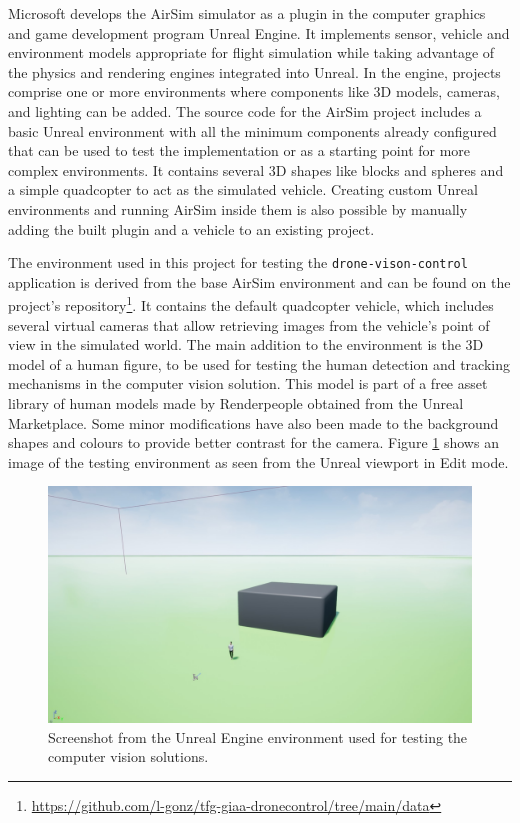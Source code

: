 Microsoft develops the AirSim simulator as a plugin in the computer graphics and game development program Unreal Engine.
It implements sensor, vehicle and environment models appropriate for flight simulation while taking advantage of the physics and rendering engines integrated into Unreal.
In the engine, projects comprise one or more environments where components like 3D models, cameras, and lighting can be added. 
The source code for the AirSim project includes a basic Unreal environment with all the minimum components already configured that can be used to test the implementation or as a starting point for more complex environments. It contains several 3D shapes like blocks and spheres and a simple quadcopter to act as the simulated vehicle.
Creating custom Unreal environments and running AirSim inside them is also possible by manually adding the built plugin and a vehicle to an existing project.

The environment used in this project for testing the \texttt{drone-vison-control} application is derived from the base AirSim environment and can be found on the project’s repository\footnote{\url{https://github.com/l-gonz/tfg-giaa-dronecontrol/tree/main/data}}. It contains the default quadcopter vehicle, which includes several virtual cameras that allow retrieving images from the vehicle’s point of view in the simulated world. 
The main addition to the environment is the 3D model of a human figure, to be used for testing the human detection and tracking mechanisms in the computer vision solution. This model is part of a free asset library of human models made by Renderpeople \cite{render-people} obtained from the Unreal Marketplace.
Some minor modifications have also been made to the background shapes and colours to provide better contrast for the camera.
Figure \ref{fig:unreal-env} shows an image of the testing environment as seen from the Unreal viewport in Edit mode.


\begin{figure}
  \centering
  \includegraphics[width=\textwidth,keepaspectratio]{img/unreal-env.jpg}
  \caption{Screenshot from the Unreal Engine environment used for testing the computer vision solutions.}
  \label{fig:unreal-env}
\end{figure}


